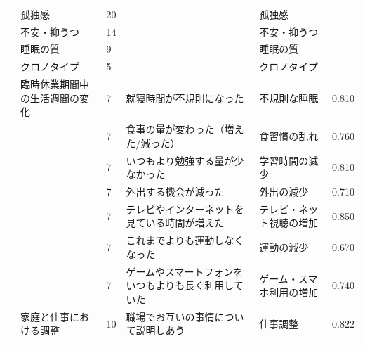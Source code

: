 \begin{landscape}
\begin{longtable}{p{2cm}p{2cm}p{2cm}p{6cm}p{2cm}p{2cm}}
                                 & 孤独感                              & 20  &                                                     & 孤独感                  &         \\
                                 & 不安・抑うつ                           & 14  &                                                     & 不安・抑うつ               &         \\
                                 & 睡眠の質                             & 9   &                                                     & 睡眠の質                 &         \\
                                 & クロノタイプ                           & 5   &                                                     & クロノタイプ               &         \\
        \citet{Kousaka202192}    & 臨時休業期間中の生活週間の変化                  & 7   & 就寝時間が不規則になった                                        & 不規則な睡眠               & 0.810   \\
                                 &                                  & 7   & 食事の量が変わった（増えた/減った）                                  & 食習慣の乱れ               & 0.760   \\
                                 &                                  & 7   & いつもより勉強する量が少なかった                                    & 学習時間の減少              & 0.810   \\
                                 &                                  & 7   & 外出する機会が減った                                          & 外出の減少                & 0.710   \\
                                 &                                  & 7   & テレビやインターネットを見ている時間が増えた                              & テレビ・ネット視聴の増加         & 0.850   \\
                                 &                                  & 7   & これまでよりも運動しなくなった                                     & 運動の減少                & 0.670   \\
                                 &                                  & 7   & ゲームやスマートフォンをいつもよりも長く利用していた                          & ゲーム・スマホ利用の増加         & 0.740   \\
        \citet{Hirai202192}      & 家庭と仕事における調整                      & 10  & 職場でお互いの事情について説明しあう                                  & 仕事調整                 & 0.822   \\

\end{longtable}
\end{landscape}
